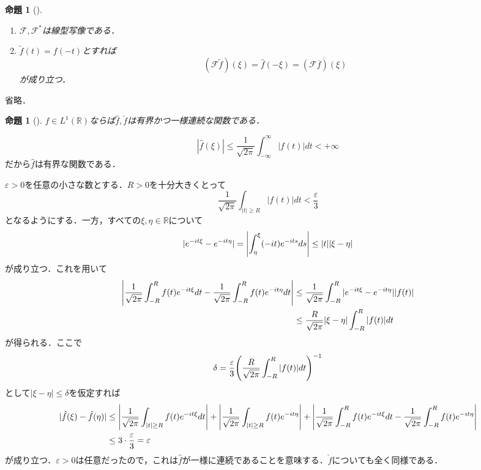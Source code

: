 \documentclass[dvipdfmx,a4j,10pt]{jsarticle}
\makeatletter
\theoremstyle{mystyle1}
\newtheorem{proposition}[theorem]{命題}
\theoremstyle{mystyle3}
\theoremstyle{mystyle4}
\theoremstyle{mystyle6}
\theoremstyle{mystyle2}
\theoremstyle{mystyle5}
\renewenvironment{proof}[1][\proofname]{\par
  \pushQED{\qed}%
  \normalfont
  \topsep6\p@\@plus6\p@ \trivlist
  \item[\hskip\labelsep{\bfseries\sffamily #1}]\ignorespaces
}{%
  \popQED\endtrivlist\@endpefalse
}
\renewcommand\proofname{証明}
\newenvironment{prop}[1][]
{\begin{tcolorbox}[
    enhanced,
    boxrule=0pt,
    arc=0mm,
    frame hidden,
    borderline west={2pt}{-4pt}{blue!50!black},
    breakable = true
    ]
    \begin{proposition}[#1]
}
{\end{proposition}\end{tcolorbox}}
\makeatother
\begin{document}
\begin{prop}
	\begin{enumerate}
		\item $\mathcal{F},\mathcal{F}^*$は線型写像である．
		\item $\tilde f(t)=f(-t)$とすれば
		      \[
			      (\mathcal{F}\tilde f)(\xi)=\hat f(-\xi)=\overline{(\mathcal{F}\overline{f})(\xi)}
		      \]
		      が成り立つ．
	\end{enumerate}
\end{prop}

\begin{proof}
	省略．
\end{proof}

\begin{prop}
	$f\in L^1(\mathbb{R})$ならば$\hat f,\check f$は有界かつ一様連続な関数である．
\end{prop}

\begin{proof}
	\[
		|\hat f(\xi)|\leq\frac{1}{\sqrt{2\pi}}\int_{-\infty}^\infty |f(t)|dt<+\infty
	\]
	だから$\hat f$は有界な関数である．

	$\varepsilon>0$を任意の小さな数とする．$R>0$を十分大きくとって
	\[
		\frac{1}{\sqrt{2\pi}}\int_{|t|\geq R}|f(t)|dt<\frac{\varepsilon}{3}
	\]
	となるようにする．一方，すべての$\xi,\eta\in\mathbb{R}$について
	\[
		|e^{-it\xi}-e^{-it\eta}|=\mleft|\int_\eta^\xi(-it)e^{-its}ds\mright|\leq |t||\xi-\eta|
	\]
	が成り立つ．これを用いて
	\[
		\begin{split}
			\mleft|\frac{1}{\sqrt{2\pi}}\int_{-R}^Rf(t)e^{-it\xi}dt-\frac{1}{\sqrt{2\pi}}\int_{-R}^Rf(t)e^{-it\eta}dt\mright|
			&\leq \frac{1}{\sqrt{2\pi}}\int_{-R}^R|e^{-it\xi}-e^{-it\eta}||f(t)| \\
			&\leq \frac{R}{\sqrt{2\pi}}|\xi-\eta|\int_{-R}^R|f(t)|dt
		\end{split}
	\]
	が得られる．ここで
	\[
		\delta=\frac{\varepsilon}{3}\mleft(\frac{R}{\sqrt{2\pi}}\int_{-R}^R|f(t)|dt\mright)^{-1}
	\]
	として$|\xi-\eta|\leq\delta$を仮定すれば
	\[
		\begin{split}
			|\hat f(\xi)-\hat f(\eta)|
			&\leq\mleft|\frac{1}{\sqrt{2\pi}}\int_{|t|\geq R}f(t)e^{-it\xi}dt\mright|+\mleft|\frac{1}{\sqrt{2\pi}}\int_{|t|\geq R}f(t)e^{-it\eta}\mright|+\mleft|\frac{1}{\sqrt{2\pi}}\int_{-R}^Rf(t)e^{-it\xi}dt-\frac{1}{\sqrt{2\pi}}\int_{-R}^Rf(t)e^{-it\eta}\mright| \\
			&\leq 3\cdot\frac{\varepsilon}{3}=\varepsilon
		\end{split}
	\]
	が成り立つ．$\varepsilon>0$は任意だったので，これは$\hat f$が一様に連続であることを意味する．$\check f$についても全く同様である．
\end{proof}
\end{document}
